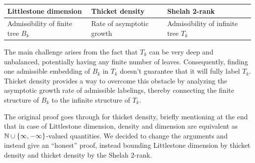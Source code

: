 \begin{table}[h]
\centering
    \begin{tabular}{p{} p{} p{}}
    Littlestone dimension & Thicket density & Shelah 2-rank\\
    \hline
    Admissibility of finite tree $B_k$ & Rate of asymptotic growth & Admissibility of infinite tree $T_k$
    \end{tabular}
\end{table}

The main challenge arises from the fact that $T_k$ can be very deep and unbalanced, potentially having any finite number of leaves. Consequently, finding one admissible embedding of $B_k$ in $T_k$ doesn't guarantee that it will fully label $T_k$. Thicket density provides a way to overcome this obstacle by analyzing the asymptotic growth rate of admissible labelings, thereby connecting the finite structure of $B_k$ to the infinite structure of $T_k$.

The original proof goes through for thicket density, briefly mentioning at the end that in case of Littlestone dimension, density and dimension are equivalent as $\mathbb{N}\cup\{\infty,-\infty\}$-valued quantities. We decided to change the arguments and instead give an \enquote{honest} proof, instead bounding Littlestone dimension by thicket density and thicket density by the Shelah 2-rank.

